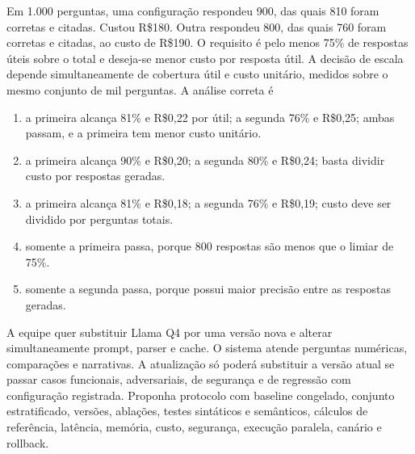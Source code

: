 \TextoBase
Em 1.000 perguntas, uma configuração respondeu 900, das quais 810 foram corretas e citadas. Custou R\$180. Outra respondeu 800, das quais 760 foram corretas e citadas, ao custo de R\$190. O requisito é pelo menos 75\% de respostas úteis sobre o total e deseja-se menor custo por resposta útil.
A decisão de escala depende simultaneamente de cobertura útil e custo unitário, medidos sobre o mesmo conjunto de mil perguntas.
\FonteDidatica
\Comando A análise correta é
\begin{enumerate}[label=\Alph*)]
\item a primeira alcança 81\% e R\$0,22 por útil; a segunda 76\% e R\$0,25; ambas passam, e a primeira tem menor custo unitário.
\item a primeira alcança 90\% e R\$0,20; a segunda 80\% e R\$0,24; basta dividir custo por respostas geradas.
\item a primeira alcança 81\% e R\$0,18; a segunda 76\% e R\$0,19; custo deve ser dividido por perguntas totais.
\item somente a primeira passa, porque 800 respostas são menos que o limiar de 75\%.
\item somente a segunda passa, porque possui maior precisão entre as respostas geradas.
\end{enumerate}

\TextoBase
A equipe quer substituir Llama Q4 por uma versão nova e alterar simultaneamente prompt, parser e cache. O sistema atende perguntas numéricas, comparações e narrativas.
A atualização só poderá substituir a versão atual se passar casos funcionais, adversariais, de segurança e de regressão com configuração registrada.
\FonteDidatica
\Comando Proponha protocolo com baseline congelado, conjunto estratificado, versões, ablações, testes sintáticos e semânticos, cálculos de referência, latência, memória, custo, segurança, execução paralela, canário e rollback.

